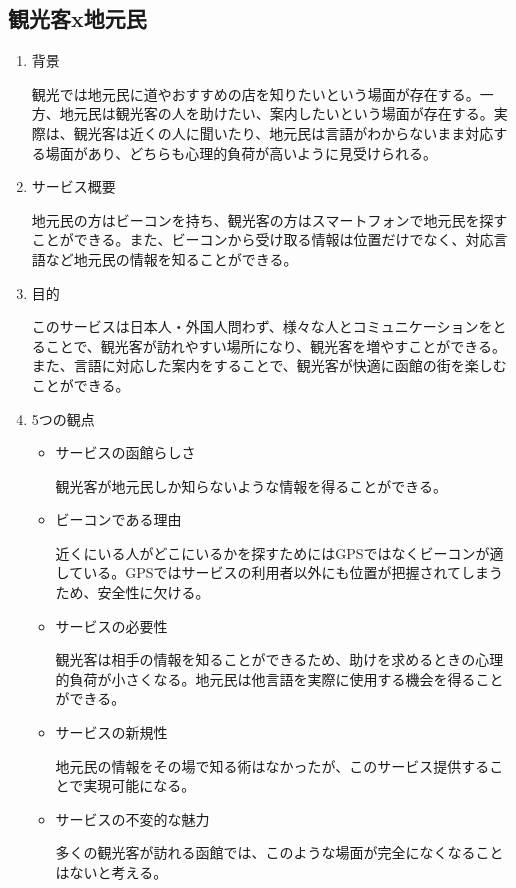 \subsection{観光客x地元民}
\begin{enumerate}
    \item 背景
    \par 観光では地元民に道やおすすめの店を知りたいという場面が存在する。一方、地元民は観光客の人を助けたい、案内したいという場面が存在する。実際は、観光客は近くの人に聞いたり、地元民は言語がわからないまま対応する場面があり、どちらも心理的負荷が高いように見受けられる。
    \item サービス概要
    \par 地元民の方はビーコンを持ち、観光客の方はスマートフォンで地元民を探すことができる。また、ビーコンから受け取る情報は位置だけでなく、対応言語など地元民の情報を知ることができる。
    \item 目的
    \par このサービスは日本人・外国人問わず、様々な人とコミュニケーションをとることで、観光客が訪れやすい場所になり、観光客を増やすことができる。また、言語に対応した案内をすることで、観光客が快適に函館の街を楽しむことができる。
    \item 5つの観点
    \begin{itemize}
        \item サービスの函館らしさ
        \par 観光客が地元民しか知らないような情報を得ることができる。
        \item ビーコンである理由
        \par 近くにいる人がどこにいるかを探すためにはGPSではなくビーコンが適している。GPSではサービスの利用者以外にも位置が把握されてしまうため、安全性に欠ける。
        \item サービスの必要性
        \par 観光客は相手の情報を知ることができるため、助けを求めるときの心理的負荷が小さくなる。地元民は他言語を実際に使用する機会を得ることができる。
        \item サービスの新規性
        \par 地元民の情報をその場で知る術はなかったが、このサービス提供することで実現可能になる。
        \item サービスの不変的な魅力
        \par 多くの観光客が訪れる函館では、このような場面が完全になくなることはないと考える。
    \end{itemize}
\end{enumerate}

